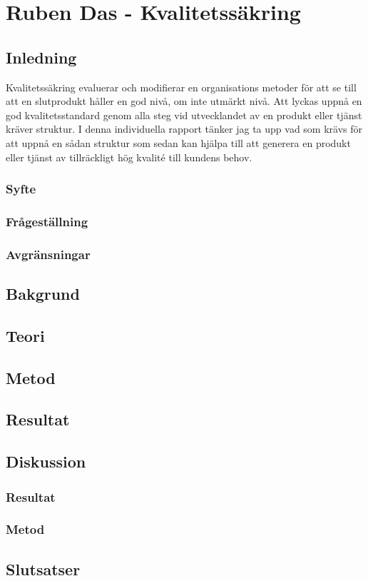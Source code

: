 \section{Ruben Das - Kvalitetssäkring}
\subsection{Inledning}
Kvalitetssäkring evaluerar och modifierar en organisations metoder för att se till att en slutprodukt håller en god nivå, om inte utmärkt nivå.
\newline
\newline
Att lyckas uppnå en god kvalitetsstandard genom alla steg vid utvecklandet av en produkt eller tjänst kräver struktur. I denna individuella rapport tänker jag ta upp vad som krävs för att uppnå en sådan struktur som sedan kan hjälpa till att generera en produkt eller tjänst av tillräckligt hög kvalité till kundens behov.

\subsubsection{Syfte}

\subsubsection{Frågeställning}

\subsubsection{Avgränsningar}

\subsection{Bakgrund}

\subsection{Teori}

\subsection{Metod}

\subsection{Resultat}

\subsection{Diskussion}

\subsubsection{Resultat}

\subsubsection{Metod}

\subsection{Slutsatser}
